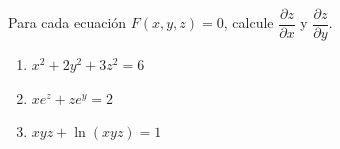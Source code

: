 Para cada ecuación $F(x, y, z) = 0$, calcule $\dfrac{\partial z}{\partial x}$ y $\dfrac{\partial z}{\partial y}$.
\begin{enumerate}
    \item $x^2 + 2y^2 + 3z^2 = 6$
    \item $xe^z + ze^y = 2$
    \item $xyz + \ln(xyz) = 1$
\end{enumerate}
